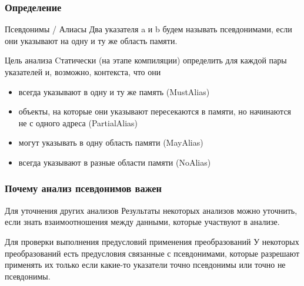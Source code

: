 \documentclass[utf8,russian]{beamer}
\begin{document}
\begin{frame}
\frametitle{Определение}

\begin{block}{Псевдонимы / Алиасы}
Два указателя a и b будем называть псевдонимами, если они указывают на одну и ту же область памяти.
\end{block}

\begin{block}{Цель анализа}
Cтатически (на этапе компиляции) определить для каждой пары указателей и, возможно, контекста, что они
\begin{itemize}
\item всегда указывают в одну и ту же память (MustAlias)
\item объекты, на которые они указывают пересекаются в памяти, но начинаются не с одного адреса (PartialAlias)
\item могут указывать в одну область памяти (MayAlias)
\item всегда указывают в разные области памяти (NoAlias)
\end{itemize}
\end{block}

\end{frame}


\begin{frame}
\frametitle{Почему анализ псевдонимов важен}

\begin{block}{Для уточнения других анализов}
Результаты некоторых анализов можно уточнить, если знать взаимоотношения между данными, которые участвуют в анализе.
\end{block}

\begin{block}{Для проверки выполнения предусловий применения преобразований}
У некоторых преобразований есть предусловия связанные с псевдонимами, которые разрешают применять их только если какие-то указатели точно псевдонимы или точно не псевдонимы.
\end{block}

\end{frame}

\end{document}
